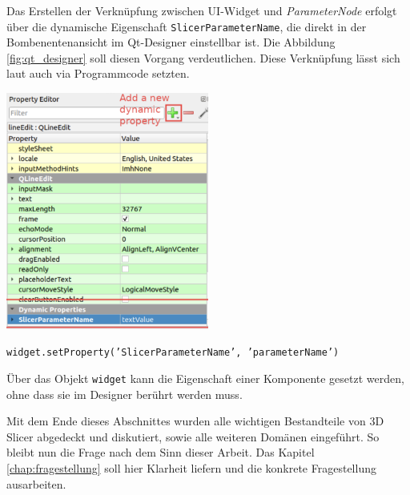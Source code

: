 \begin{minipage}{0.35\textwidth}
	Das Erstellen der Verknüpfung zwischen \ac{UI}-Widget und \textit{ParameterNode}
	erfolgt über die dynamische Eigenschaft \texttt{SlicerParameterName}, die direkt
	in der Bombenentenansicht im Qt-Designer einstellbar ist. Die Abbildung
	\ref{fig:qt_designer} soll diesen Vorgang verdeutlichen. Diese Verknüpfung lässt
	sich laut \citet{slicer2024} auch via Programmcode setzten.
\end{minipage}
\hfill
\begin{minipage}{0.55\textwidth}
	\centering
	\includegraphics[width=0.5\textwidth]{img/qt_designer.jpg}
	\label{fig:qt_designer}
\end{minipage}

\begin{center}
	\texttt{widget.setProperty('SlicerParameterName', 'parameterName')}
\end{center}

Über das Objekt \texttt{widget} kann die Eigenschaft einer Komponente gesetzt werden,
ohne dass sie im Designer berührt werden muss.

Mit dem Ende dieses Abschnittes wurden alle wichtigen Bestandteile von 3D Slicer
abgedeckt und diskutiert, sowie alle weiteren Domänen eingeführt. So bleibt nun
die Frage nach dem Sinn dieser Arbeit. Das Kapitel \ref{chap:fragestellung} soll
hier Klarheit liefern und die konkrete Fragestellung ausarbeiten.
